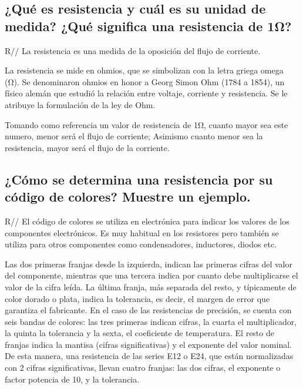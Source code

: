 \documentclass[letterpaper, 12pt]{report}
\begin{document}
\subsection{¿Qué es resistencia y cuál es su unidad de medida? ¿Qué
	significa una resistencia de 1Ω?}

R// La resistencia es una medida de la oposición del flujo de corriente.
~\cite{DefinicionResistenciaPlusOhmios}

\vspace{.5cm}

La resistencia se mide en ohmios, que se simbolizan con la letra griega
omega (Ω). Se denominaron ohmios en honor a Georg Simon Ohm (1784 a 1854),
un físico alemán que estudió la relación entre voltaje, corriente y
resistencia. Se le atribuye la formulación de la ley de Ohm.
~\cite{DefinicionResistenciaPlusOhmios}

\vspace{.5cm}

Tomando como referencia un valor de resistencia de 1Ω, cuanto mayor sea este
numero, menor será el flujo de corriente; Asimismo cuanto menor sea la
resistencia, mayor será el flujo de la corriente.
~\cite{DefinicionResistenciaPlusOhmios}

\subsection{¿Cómo se determina una resistencia por su código de
	colores? Muestre un ejemplo.}

R// El código de colores se utiliza en electrónica para indicar los
valores de los componentes electrónicos. Es muy habitual en los resistores
pero también se utiliza para otros componentes como condensadores,
inductores, diodos etc.~\cite{CodigoColores}

\vspace{.5cm}

Las dos primeras franjas desde la izquierda, indican las primeras cifras
del valor del componente, mientras que una tercera indica por cuanto debe
multiplicarse el valor de la cifra leída. La última franja, más separada
del resto, y típicamente de color dorado o plata, indica la tolerancia,
es decir, el margen de error que garantiza el fabricante. En el caso de
las resistencias de precisión, se cuenta con seis bandas de colores: las
tres primeras indican cifras, la cuarta el multiplicador, la quinta la
tolerancia y la sexta, el coeficiente de temperatura. El resto de franjas
indica la mantisa (cifras significativas) y el exponente del valor
nominal. De esta manera, una resistencia de las series E12 o E24, que
están normalizadas con 2 cifras significativas, llevan cuatro franjas: las
dos cifras, el exponente o factor potencia de 10, y la tolerancia.
\end{document}
